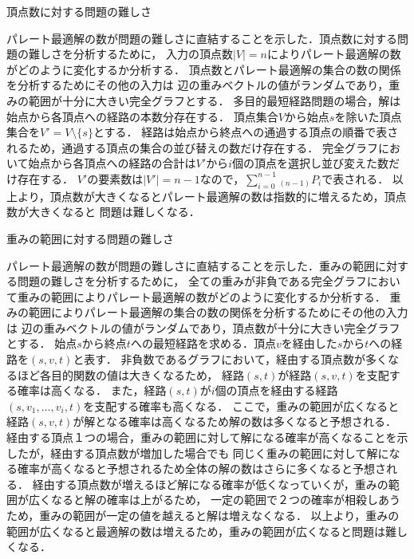 \documentclass[12pt]{optlab-bachelor}
\begin{document}
\begin{description}
  \item[頂点数に対する問題の難しさ]
\end{description}

パレート最適解の数が問題の難しさに直結することを示した．頂点数に対する問題の難しさを分析するために，
入力の頂点数$|V|=n$によりパレート最適解の数がどのように変化するか分析する．
頂点数とパレート最適解の集合の数の関係を分析するためにその他の入力は
辺の重みベクトルの値がランダムであり，重みの範囲が十分に大きい完全グラフとする．
多目的最短経路問題の場合，解は始点から各頂点への経路の本数分存在する．
頂点集合$V$から始点$s$を除いた頂点集合を$V'=V \setminus \{s\}$とする．
経路は始点から終点への通過する頂点の順番で表されるため，通過する頂点の集合の並び替えの数だけ存在する．
完全グラフにおいて始点から各頂点への経路の合計は$V'$から$i$個の頂点を選択し並び変えた数だけ存在する．
$V'$の要素数は$|V'|=n-1$なので，$\displaystyle \sum_{i=0}^{n-1} {}_{(n-1)}P_i$で表される．
以上より，頂点数が大きくなるとパレート最適解の数は指数的に増えるため，頂点数が大きくなると
問題は難しくなる．

\begin{description}
  \item[重みの範囲に対する問題の難しさ]
\end{description}

パレート最適解の数が問題の難しさに直結することを示した．重みの範囲に対する問題の難しさを分析するために，
全ての重みが非負である完全グラフにおいて重みの範囲によりパレート最適解の数がどのように変化するか分析する．
重みの範囲によりパレート最適解の集合の数の関係を分析するためにその他の入力は
辺の重みベクトルの値がランダムであり，頂点数が十分に大きい完全グラフとする．
始点$s$から終点$t$への最短経路を求める．頂点$v$を経由した$s$から$t$への経路を$(s,v,t)$と表す．
非負数であるグラフにおいて，経由する頂点数が多くなるほど各目的関数の値は大きくなるため，
経路$(s,t)$が経路$(s,v,t)$を支配する確率は高くなる．
また，経路$(s,t)$が$i$個の頂点を経由する経路$(s,v_1,\ldots,v_i,t)$を支配する確率も高くなる．
ここで，重みの範囲が広くなると経路$(s,v,t)$が解となる確率は高くなるため解の数は多くなると予想される．
経由する頂点１つの場合，重みの範囲に対して解になる確率が高くなることを示したが，経由する頂点数が増加した場合でも
同じく重みの範囲に対して解になる確率が高くなると予想されるため全体の解の数はさらに多くなると予想される．
経由する頂点数が増えるほど解になる確率が低くなっていくが，重みの範囲が広くなると解の確率は上がるため，
一定の範囲で２つの確率が相殺しあうため，重みの範囲が一定の値を越えると解は増えなくなる．
以上より，重みの範囲が広くなると最適解の数は増えるため，重みの範囲が広くなると問題は難しくなる．
\end{document}
